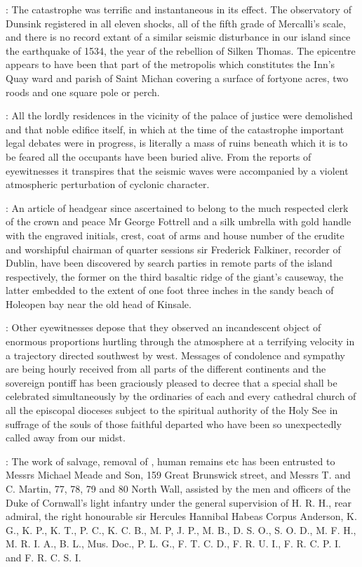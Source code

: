 :
The catastrophe was terrific and instantaneous in its effect. The
observatory of Dunsink registered in all eleven shocks, all of the fifth
grade of Mercalli's scale, and there is no record extant of a similar
seismic disturbance in our island since the earthquake of 1534, the
year of the rebellion of Silken Thomas. The epicentre appears to have
been that part of the metropolis which constitutes the Inn's Quay
ward and parish of Saint Michan covering a surface of fortyone acres,
two roods and one square pole or perch.

:
All the lordly residences in
the vicinity of the palace of justice were demolished and that noble
edifice itself, in which at the time of the catastrophe important
legal debates were in progress, is literally a mass of ruins beneath
which it is to be feared all the occupants have been buried alive.
From the reports of eyewitnesses it transpires that the seismic waves
were accompanied by a violent atmospheric perturbation of cyclonic
character.

:
An article of headgear since ascertained to belong to the much
respected clerk of the crown and peace Mr George Fottrell and a silk
umbrella with gold handle with the engraved initials, crest, coat of arms
and house number of the erudite and worshipful chairman of quarter
sessions sir Frederick Falkiner, recorder of Dublin, have been discovered
by search parties in remote parts of the island respectively, the former
on the third basaltic ridge of the giant's causeway, the latter embedded
to the extent of one foot three inches in the sandy beach of Holeopen
bay near the old head of Kinsale.

:
Other eyewitnesses depose that they
observed an incandescent object of enormous proportions hurtling through
the atmosphere at a terrifying velocity in a trajectory directed
southwest by west. Messages of condolence and sympathy are being
hourly received from all parts of the different continents and the
sovereign pontiff has been graciously pleased to decree that a
special  shall be celebrated simultaneously by
the ordinaries of each and every cathedral church of all the episcopal
dioceses subject to the spiritual authority of the Holy See in suffrage of
the souls of those faithful departed who have been so unexpectedly called
away from our midst.

:
The work of salvage, removal of ,
human remains etc has been entrusted to Messrs Michael Meade and Son, 159 Great
Brunswick street, and Messrs T. and C. Martin, 77, 78, 79 and 80 North
Wall, assisted by the men and officers of the Duke of Cornwall's light
infantry under the general supervision of H. R. H., rear admiral, the
right honourable sir Hercules Hannibal Habeas Corpus Anderson, K. G.,
K. P., K. T., P. C., K. C. B., M. P, J. P., M. B., D. S. O., S. O. D.,
M. F. H., M. R. I. A., B. L., Mus. Doc., P. L. G., F. T. C. D.,
F. R. U. I., F. R. C. P. I. and F. R. C. S. I.

